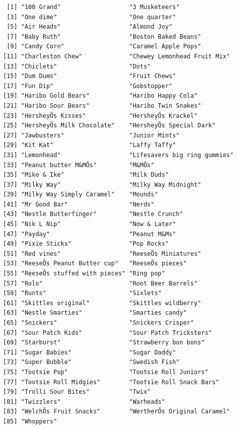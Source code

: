 \documentclass[
  letterpaper,
  DIV=11,
  numbers=noendperiod]{scrartcl}
\begin{document}
\begin{verbatim}
 [1] "100 Grand"                   "3 Musketeers"               
 [3] "One dime"                    "One quarter"                
 [5] "Air Heads"                   "Almond Joy"                 
 [7] "Baby Ruth"                   "Boston Baked Beans"         
 [9] "Candy Corn"                  "Caramel Apple Pops"         
[11] "Charleston Chew"             "Chewey Lemonhead Fruit Mix" 
[13] "Chiclets"                    "Dots"                       
[15] "Dum Dums"                    "Fruit Chews"                
[17] "Fun Dip"                     "Gobstopper"                 
[19] "Haribo Gold Bears"           "Haribo Happy Cola"          
[21] "Haribo Sour Bears"           "Haribo Twin Snakes"         
[23] "HersheyÕs Kisses"            "HersheyÕs Krackel"          
[25] "HersheyÕs Milk Chocolate"    "HersheyÕs Special Dark"     
[27] "Jawbusters"                  "Junior Mints"               
[29] "Kit Kat"                     "Laffy Taffy"                
[31] "Lemonhead"                   "Lifesavers big ring gummies"
[33] "Peanut butter M&MÕs"         "M&MÕs"                      
[35] "Mike & Ike"                  "Milk Duds"                  
[37] "Milky Way"                   "Milky Way Midnight"         
[39] "Milky Way Simply Caramel"    "Mounds"                     
[41] "Mr Good Bar"                 "Nerds"                      
[43] "Nestle Butterfinger"         "Nestle Crunch"              
[45] "Nik L Nip"                   "Now & Later"                
[47] "Payday"                      "Peanut M&Ms"                
[49] "Pixie Sticks"                "Pop Rocks"                  
[51] "Red vines"                   "ReeseÕs Miniatures"         
[53] "ReeseÕs Peanut Butter cup"   "ReeseÕs pieces"             
[55] "ReeseÕs stuffed with pieces" "Ring pop"                   
[57] "Rolo"                        "Root Beer Barrels"          
[59] "Runts"                       "Sixlets"                    
[61] "Skittles original"           "Skittles wildberry"         
[63] "Nestle Smarties"             "Smarties candy"             
[65] "Snickers"                    "Snickers Crisper"           
[67] "Sour Patch Kids"             "Sour Patch Tricksters"      
[69] "Starburst"                   "Strawberry bon bons"        
[71] "Sugar Babies"                "Sugar Daddy"                
[73] "Super Bubble"                "Swedish Fish"               
[75] "Tootsie Pop"                 "Tootsie Roll Juniors"       
[77] "Tootsie Roll Midgies"        "Tootsie Roll Snack Bars"    
[79] "Trolli Sour Bites"           "Twix"                       
[81] "Twizzlers"                   "Warheads"                   
[83] "WelchÕs Fruit Snacks"        "WertherÕs Original Caramel" 
[85] "Whoppers"                   
\end{verbatim}
\end{document}

